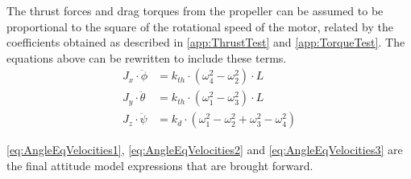 The thrust forces and drag torques from the propeller can be assumed to be proportional to the square of the rotational speed of the motor, related by the coefficients obtained as described in \autoref{app:ThrustTest} and \ref{app:TorqueTest}. The equations above can be rewritten to include these terms.
%
\begin{align}
J_x\cdot\ddot{\phi}&=k_{th} \cdot(\omega^2_4-\omega^2_2) \cdot L \label{eq:AngleEqVelocities1}\\
J_y \cdot\ddot{\theta}&=k_{th} \cdot(\omega^2_1-\omega^2_3) \cdot L \label{eq:AngleEqVelocities2} \\
J_z\cdot\ddot{\psi}&=k_d \cdot(\omega^2_1-\omega^2_2+\omega^2_3-\omega^2_4)
\label{eq:AngleEqVelocities3}
\end{align}
\begin{where}
\end{where}

\autoref{eq:AngleEqVelocities1}, \autoref{eq:AngleEqVelocities2} 
and \autoref{eq:AngleEqVelocities3} are the final attitude model expressions that are brought forward. %